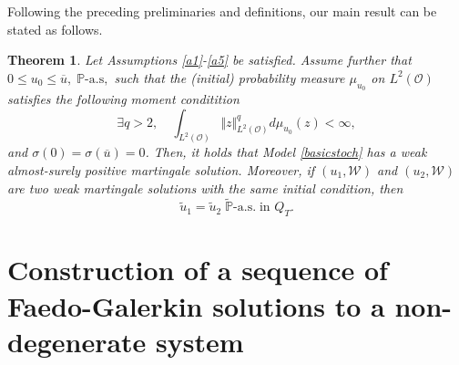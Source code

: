 \documentclass[10pt,number,preprint,times]{elsarticle}
\numberwithin{equation}{section} %
\newtheorem{thm}{Theorem}[section]
\begin{document}
Following the preceding preliminaries and definitions, our main result can be stated as follows. 
\begin{thm}
Let Assumptions \ref{a1}-\ref{a5} be satisfied. Assume further that $0 \leq u_0 \leq \overline{u},\; \mathbb{P}\text{-a.s},$  such that the (initial) probability measure $\mu_{u_0}$ on $L^2(\mathcal{O})$ satisfies the following moment
conditition
$$
\exists q>2, \quad \int_{L^2(\mathcal{O})} \Vert z \Vert_{L^2(\mathcal{O})}^q d\mu_{u_0}(z)< \infty,
$$
and $\sigma(0)=\sigma(\overline{u})=0$. Then, it holds that Model \eqref{basicstoch} has a weak almost-surely positive martingale solution. Moreover, if $(u_1,\mathcal{W})$ and $(u_2,\mathcal{W})$ are two weak martingale solutions with the same initial condition, then
	$$\tilde{u}_1=\tilde{u}_2 \; \tilde{\mathbb{P}}\text{-a.s.} \; \text{in } {Q}_T.$$
\end{thm}
\section{Construction of a sequence of Faedo-Galerkin solutions to a non-degenerate system}\label{section3}
\end{document}
